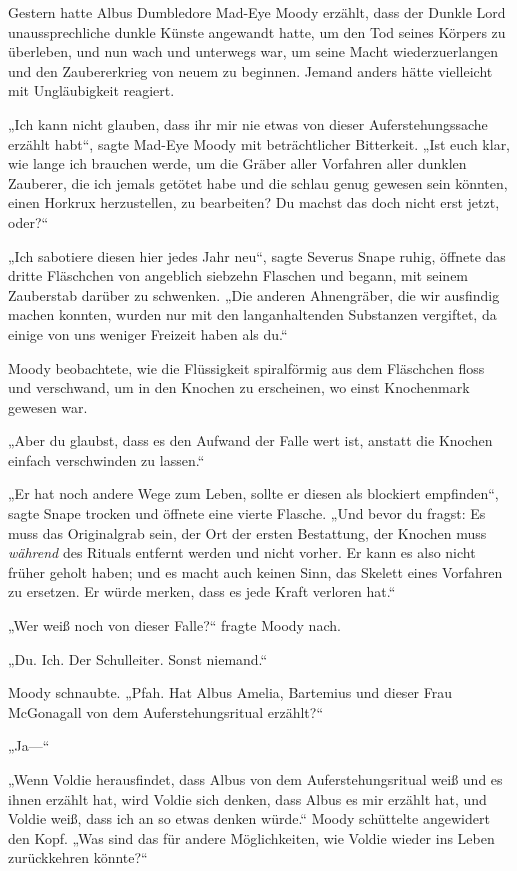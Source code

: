 {Gestern hatte Albus Dumbledore Mad-Eye Moody erzählt, dass der Dunkle Lord unaussprechliche dunkle Künste angewandt hatte, um den Tod seines Körpers zu überleben, und nun wach und unterwegs war, um seine Macht wiederzuerlangen und den Zaubererkrieg von neuem zu beginnen. Jemand anders hätte vielleicht mit Ungläubigkeit reagiert.

„Ich kann nicht glauben, dass ihr mir nie etwas von dieser Auferstehungssache erzählt habt“, sagte Mad-Eye Moody mit beträchtlicher Bitterkeit. „Ist euch klar, wie lange ich brauchen werde, um die Gräber aller Vorfahren aller dunklen Zauberer, die ich jemals getötet habe und die schlau genug gewesen sein könnten, einen Horkrux herzustellen, zu bearbeiten? Du machst das doch nicht erst jetzt, oder?“

„Ich sabotiere diesen hier jedes Jahr neu“, sagte Severus Snape ruhig, öffnete das dritte Fläschchen von angeblich siebzehn Flaschen und begann, mit seinem Zauberstab darüber zu schwenken. „Die anderen Ahnengräber, die wir ausfindig machen konnten, wurden nur mit den langanhaltenden Substanzen vergiftet, da einige von uns weniger Freizeit haben als du.“

Moody beobachtete, wie die Flüssigkeit spiralförmig aus dem Fläschchen floss und verschwand, um in den Knochen zu erscheinen, wo einst Knochenmark gewesen war.

„Aber du glaubst, dass es den Aufwand der Falle wert ist, anstatt die Knochen einfach verschwinden zu lassen.“

„Er hat noch andere Wege zum Leben, sollte er diesen als blockiert empfinden“, sagte Snape trocken und öffnete eine vierte Flasche. „Und bevor du fragst: Es muss das Originalgrab sein, der Ort der ersten Bestattung, der Knochen muss \emph{während} des Rituals entfernt werden und nicht vorher. Er kann es also nicht früher geholt haben; und es macht auch keinen Sinn, das Skelett eines Vorfahren zu ersetzen. Er würde merken, dass es jede Kraft verloren hat.“

„Wer weiß noch von dieser Falle?“ fragte Moody nach.

„Du. Ich. Der Schulleiter. Sonst niemand.“

Moody schnaubte. „Pfah. Hat Albus Amelia, Bartemius und dieser Frau McGonagall von dem Auferstehungsritual erzählt?“

„Ja—“

„Wenn Voldie herausfindet, dass Albus von dem Auferstehungsritual weiß und es ihnen erzählt hat, wird Voldie sich denken, dass Albus es mir erzählt hat, und Voldie weiß, dass ich an so etwas denken würde.“ Moody schüttelte angewidert den Kopf. „Was sind das für andere Möglichkeiten, wie Voldie wieder ins Leben zurückkehren könnte?“

}
